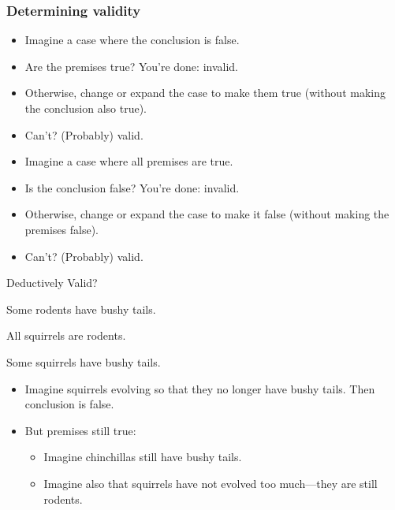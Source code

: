 \begin{frame}
  \frametitle{Determining validity}

  \begin{itemize}[<+->]
    \item Imagine a case where the conclusion is false.
    \item Are the premises true? You're done: invalid.
    \item Otherwise, change or expand the case to make them true
    (without making the conclusion also true).
    \item Can't? (Probably) valid.
  \end{itemize}


  \begin{itemize}[<+->]
    \item Imagine a case where all premises are true.
    \item Is the conclusion false? You're done: invalid.
    \item Otherwise, change or expand the case to make it false
    (without making the premises false).
    \item Can't? (Probably) valid.
  \end{itemize}
\end{frame}

\begin{frame}{Deductively Valid?}
  \begin{earg}
    \item[] Some rodents have bushy tails.
    \item[] All squirrels are rodents.
    \item[\therefore] Some squirrels have bushy tails.
  \end{earg}
\pause
  \begin{itemize}[<+->]
    \item Imagine squirrels evolving so that they no longer have bushy
    tails. Then conclusion is false.
    \item But premises still true:
    \begin{itemize}[<+->]
      \item Imagine chinchillas still have bushy tails.
      \item Imagine also that squirrels have not evolved too
      much---they are still rodents.
    \end{itemize}
  \end{itemize}
\end{frame}

